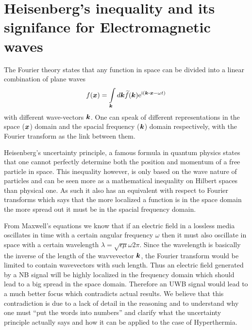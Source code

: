 \documentclass[11pt,a4paper, 
english, swedish %
]{article}
\begin{document}


%








\section{Heisenberg's inequality and its signifance for Electromagnetic waves}
The Fourier theory states that any function in space can be divided into a linear combination of plane waves 
\begin{equation*}
 f(\vb*x) = \int_{\vb*k}d\vb*k \widetilde{f}(\vb*k) \ee^{\ii( \vb*k\vdot\vb*x - \omega t)}
\end{equation*}
with different wave-vectors $\vb*k$. %
One can speak of different representations in the space ($\vb*x$) domain and the spacial frequency ($\vb*k$) domain respectively, with the Fourier transform as the link between them.

Heisenberg's uncertainty principle, a famous formula in quantum physics states that one cannot perfectly determine both the position and momentum of a free particle in space. This inequality however, is only based on the wave nature of particles and can be seen more as a mathematical inequality on Hilbert spaces than  physical one. As such it also has an equivalent with respect to Fourier transforms which says that the more localized a function is in the space domain the more spread out it must be in the spacial frequency domain.

From Maxwell's equations we know that if an electric field in a lossless media oscillates in time with a certain angular frequency $\omega$ then it  must also oscillate in space with a certain wavelength $\lambda=\sqrt{\epsilon \mu} \omega 2\pi$. Since the wavelength is basically the inverse of the length of the wavvevector $\vb*k$, the Fourier transform would be limited to contain wavevectors with such length. Thus an electric field generated by a NB signal will be highly localized in the frequency domain which should lead to a big spread in the space domain. Therefore an UWB signal would lead to a much better focus which contradicts actual results. We believe that this contradiction is due to a lack of detail in the reasoning and to understand why one must ``put the words into numbers'' and clarify what the uncertainty principle actually says and how it can be applied to the case of Hyperthermia.
\end{document}
